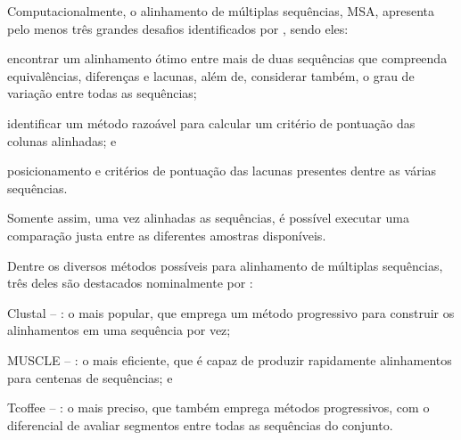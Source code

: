 \documentclass[english,brazilian]{UNISINOSmonografia} %
\begin{document}
Computacionalmente, o alinhamento de múltiplas sequências, MSA, apresenta pelo menos três grandes desafios identificados por , sendo eles: \begin{inparaenum} 
	\item encontrar um alinhamento ótimo entre mais de duas sequências que compreenda equivalências, diferenças e lacunas, além de, considerar também, o grau de variação entre todas as sequências;
	\item identificar um método razoável para calcular um critério de pontuação das colunas alinhadas; e
	\item posicionamento e critérios de pontuação das lacunas presentes dentre as várias sequências.
\end{inparaenum}
Somente assim, uma vez alinhadas as sequências, é possível executar uma comparação justa entre as diferentes amostras disponíveis.


%
%
%
%

Dentre os diversos métodos possíveis para alinhamento de múltiplas sequências, três deles são destacados nominalmente por :
 \begin{inparaenum} 
	\item Clustal -- \cite{Sievers2014}: o mais popular, que emprega um método progressivo para construir os alinhamentos em uma sequência por vez;
	\item MUSCLE -- \cite{Edgar2004}: o mais eficiente, que é capaz de produzir rapidamente alinhamentos para centenas de sequências; e
	\item Tcoffee -- \cite{Notredame2000}: o mais preciso, que também emprega métodos progressivos, com o diferencial de avaliar segmentos entre todas as sequências do conjunto.
\end{inparaenum}
\end{document}
